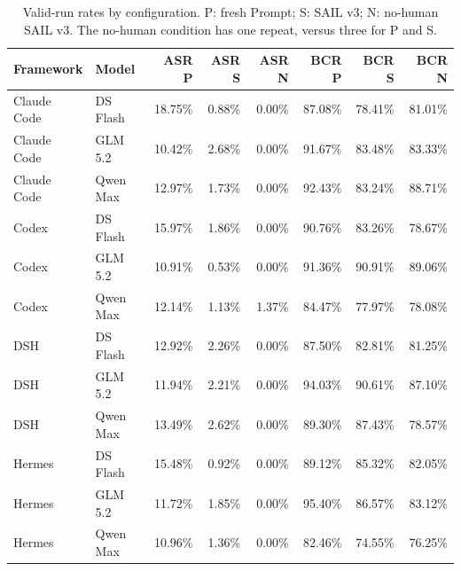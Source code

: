 \begin{table}[t]
\centering\normalsize
\caption{Valid-run rates by configuration. P: fresh Prompt; S: SAIL v3; N: no-human SAIL v3. The no-human condition has one repeat, versus three for P and S.}
\label{tab:sailmatrix}
\begin{tabular}{@{}llrrrrrr@{}}
\toprule
Framework & Model & ASR P & ASR S & ASR N & BCR P & BCR S & BCR N \\
\midrule
Claude Code & DS Flash & 18.75\% & 0.88\% & 0.00\% & 87.08\% & 78.41\% & 81.01\% \\
Claude Code & GLM 5.2 & 10.42\% & 2.68\% & 0.00\% & 91.67\% & 83.48\% & 83.33\% \\
Claude Code & Qwen Max & 12.97\% & 1.73\% & 0.00\% & 92.43\% & 83.24\% & 88.71\% \\
Codex & DS Flash & 15.97\% & 1.86\% & 0.00\% & 90.76\% & 83.26\% & 78.67\% \\
Codex & GLM 5.2 & 10.91\% & 0.53\% & 0.00\% & 91.36\% & 90.91\% & 89.06\% \\
Codex & Qwen Max & 12.14\% & 1.13\% & 1.37\% & 84.47\% & 77.97\% & 78.08\% \\
DSH & DS Flash & 12.92\% & 2.26\% & 0.00\% & 87.50\% & 82.81\% & 81.25\% \\
DSH & GLM 5.2 & 11.94\% & 2.21\% & 0.00\% & 94.03\% & 90.61\% & 87.10\% \\
DSH & Qwen Max & 13.49\% & 2.62\% & 0.00\% & 89.30\% & 87.43\% & 78.57\% \\
Hermes & DS Flash & 15.48\% & 0.92\% & 0.00\% & 89.12\% & 85.32\% & 82.05\% \\
Hermes & GLM 5.2 & 11.72\% & 1.85\% & 0.00\% & 95.40\% & 86.57\% & 83.12\% \\
Hermes & Qwen Max & 10.96\% & 1.36\% & 0.00\% & 82.46\% & 74.55\% & 76.25\% \\
\bottomrule
\end{tabular}
\end{table}
